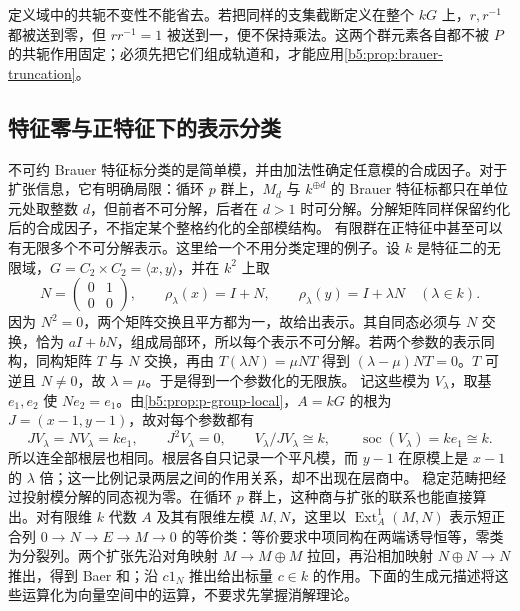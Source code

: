 \ProseParagraphBreak

定义域中的共轭不变性不能省去。若把同样的支集截断定义在整个 \(kG\) 上，\(r,r^{-1}\) 都被送到零，但 \(rr^{-1}=1\) 被送到一，便不保持乘法。这两个群元素各自都不被 \(P\) 的共轭作用固定；必须先把它们组成轨道和，才能应用\cref{b5:prop:brauer-truncation}。

\subsection{特征零与正特征下的表示分类}
\label{b5:subsec:0804:03}

不可约 Brauer 特征标分类的是简单模，并由加法性确定任意模的合成因子。对于扩张信息，它有明确局限：循环 \(p\) 群上，\(M_d\) 与 \(k^{\oplus d}\) 的 Brauer 特征标都只在单位元处取整数 \(d\)，但前者不可分解，后者在 \(d>1\) 时可分解。分解矩阵同样保留约化后的合成因子，不指定某个整格约化的全部模结构。
\ProseParagraphBreak
有限群在正特征中甚至可以有无限多个不可分解表示。这里给一个不用分类定理的例子。设 \(k\) 是特征二的无限域，\(G=C_2\times C_2=\langle x,y\rangle\)，并在 \(k^2\) 上取
\[
	N=\begin{pmatrix}0&1\\0&0\end{pmatrix},\qquad
	\rho_\lambda(x)=I+N,\qquad \rho_\lambda(y)=I+\lambda N \quad(\lambda\in k).
\]
因为 \(N^2=0\)，两个矩阵交换且平方都为一，故给出表示。其自同态必须与 \(N\) 交换，恰为 \(aI+bN\)，组成局部环，所以每个表示不可分解。若两个参数的表示同构，同构矩阵 \(T\) 与 \(N\) 交换，再由 \(T(\lambda N)=\mu NT\) 得到 \((\lambda-\mu)NT=0\)。\(T\) 可逆且 \(N\ne0\)，故 \(\lambda=\mu\)。于是得到一个参数化的无限族。 记这些模为 \(V_\lambda\)，取基 \(e_1,e_2\) 使 \(Ne_2=e_1\)。由\cref{b5:prop:p-group-local}，\(A=kG\) 的根为 \(J=(x-1,y-1)\)，故对每个参数都有
\[
	JV_\lambda=NV_\lambda=ke_1,\qquad J^2V_\lambda=0, \qquad V_\lambda/JV_\lambda\cong k, \qquad \operatorname{soc}(V_\lambda)=ke_1\cong k.
\]
所以连全部根层也相同。根层各自只记录一个平凡模，而 \(y-1\) 在原模上是 \(x-1\) 的 \(\lambda\) 倍；这一比例记录两层之间的作用关系，却不出现在层商中。
\ProseParagraphBreak
稳定范畴把经过投射模分解的同态视为零。在循环 \(p\) 群上，这种商与扩张的联系也能直接算出。对有限维 \(k\) 代数 \(A\) 及其有限维左模 \(M,N\)，这里以 \(\operatorname{Ext}_A^1(M,N)\) 表示短正合列 \(0\to N\to E\to M\to0\) 的等价类：等价要求中项同构在两端诱导恒等，零类为分裂列。两个扩张先沿对角映射 \(M\to M\oplus M\) 拉回，再沿相加映射 \(N\oplus N\to N\) 推出，得到 Baer 和；沿 \(c1_N\) 推出给出标量 \(c\in k\) 的作用。下面的生成元描述将这些运算化为向量空间中的运算，不要求先掌握消解理论。

